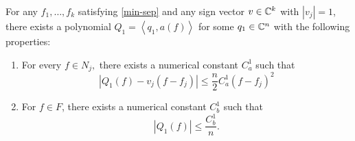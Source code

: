 \begin{theorem}
\label{dual-lin}
For any $f_1, \ldots, f_k$ satisfying \eqref{min-sep} and any sign vector $v \in \mathbb{C}^k$ with $|v_j|=1$, there exists a polynomial $Q_1 = \left<q_1, a(f)\right>$ for some $q_1 \in \mathbb{C}^n$ with the following properties: 
\begin{enumerate}
\item For every $f \in N_j,$ there exists a numerical constant $C_a^1$ such that
\begin{equation}
\label{ca1}
|Q_1(f) - v_j(f-f_j)| \leq \frac{n}{2} C_a^1 (f-f_j)^2
\end{equation}
\item For $f \in F$, there exists a numerical constant $C_b^1$ such that
\begin{equation}
\label{cb1}
|Q_1(f)| \leq \frac{C_b^1}{n}.
\end{equation}
\end{enumerate}
\end{theorem}

